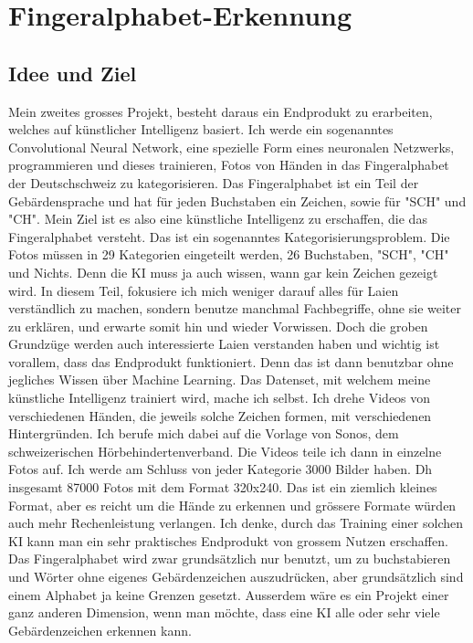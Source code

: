 \documentclass[10pt,a4paper,ngerman,english]{article}
\begin{document}
\pagebreak
\section{Fingeralphabet-Erkennung}

\subsection{Idee und Ziel}

Mein zweites grosses Projekt, besteht daraus ein Endprodukt zu erarbeiten, welches auf künstlicher Intelligenz basiert. Ich werde ein sogenanntes Convolutional Neural Network, eine spezielle Form eines neuronalen Netzwerks, programmieren und dieses trainieren, Fotos von Händen in das Fingeralphabet der Deutschschweiz zu kategorisieren. Das Fingeralphabet ist ein Teil der Gebärdensprache und hat für jeden Buchstaben ein Zeichen, sowie für "SCH" und "CH". Mein Ziel ist es also eine künstliche Intelligenz zu erschaffen, die das Fingeralphabet versteht. Das ist ein sogenanntes Kategorisierungsproblem. Die Fotos müssen in 29 Kategorien eingeteilt werden, 26 Buchstaben, "SCH", "CH" und Nichts. Denn die KI muss ja auch wissen, wann gar kein Zeichen gezeigt wird. In diesem Teil, fokusiere ich mich weniger darauf alles für Laien verständlich zu machen, sondern benutze manchmal Fachbegriffe, ohne sie weiter zu erklären, und erwarte somit hin und wieder Vorwissen. Doch die groben Grundzüge werden auch interessierte Laien verstanden haben und wichtig ist vorallem, dass das Endprodukt funktioniert. Denn das ist dann benutzbar ohne jegliches Wissen über Machine Learning. Das Datenset, mit welchem meine künstliche Intelligenz trainiert wird, mache ich selbst. Ich drehe Videos von verschiedenen Händen, die jeweils solche Zeichen formen, mit verschiedenen Hintergründen. Ich berufe mich dabei auf die Vorlage von Sonos, dem schweizerischen Hörbehindertenverband. Die Videos teile ich dann in einzelne Fotos auf. Ich werde am Schluss von jeder Kategorie 3000 Bilder haben. Dh insgesamt 87000 Fotos mit dem Format 320x240. Das ist ein ziemlich kleines Format, aber es reicht um die Hände zu erkennen und grössere Formate würden auch mehr Rechenleistung verlangen. Ich denke, durch das Training einer solchen KI kann man ein sehr praktisches Endprodukt von grossem Nutzen erschaffen. Das Fingeralphabet wird zwar grundsätzlich nur benutzt, um zu buchstabieren und Wörter ohne eigenes Gebärdenzeichen auszudrücken, aber grundsätzlich sind einem Alphabet ja keine Grenzen gesetzt. Ausserdem wäre es ein Projekt einer ganz anderen Dimension, wenn man möchte, dass eine KI alle oder sehr viele Gebärdenzeichen erkennen kann. 
\end{document}
